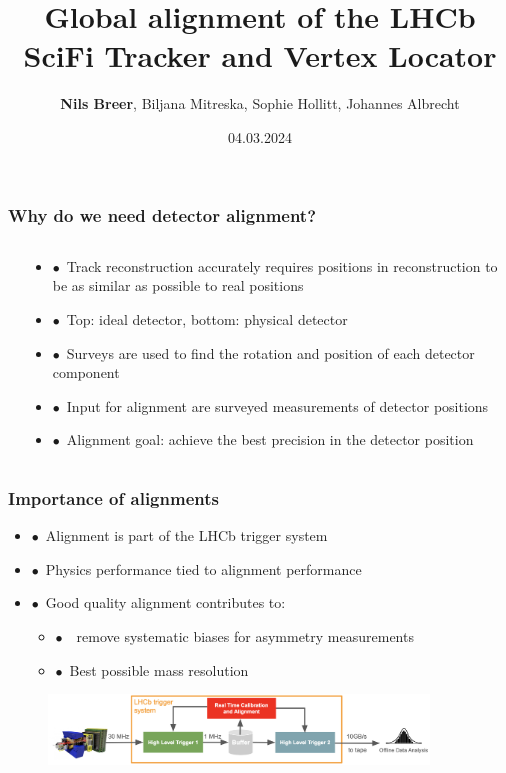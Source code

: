 \documentclass[aspectratio=1610, 12pt, xcolor=dvipsnames]{beamer}
\title{Global alignment of the LHCb SciFi Tracker and Vertex Locator}
\author[N.Breer]{\textbf{Nils Breer}, Biljana Mitreska, Sophie Hollitt, Johannes Albrecht}
\institute{DPG Conference, Karlsruhe}
\date{04.03.2024}
\begin{document}
\maketitle

\begin{frame}\frametitle{Why do we need detector alignment?}
  \begin{columns}
    \begin{column}[c]{0.5\textwidth}
      
    \end{column}
    \begin{column}[c]{0.5\textwidth}
      \begin{itemize}
        \item $\bullet$\, Track reconstruction accurately requires positions in reconstruction to be as similar as possible to real positions
        \item $\bullet$\, Top: ideal detector, bottom: physical detector
        \item $\bullet$\, Surveys are used to find the rotation and position of each detector component
        \item $\bullet$\, Input for alignment are surveyed measurements of detector positions
        \item $\bullet$\, Alignment goal: achieve the best precision in the detector position
      \end{itemize}
    \end{column}
  \end{columns}
\end{frame}

\begin{frame}\frametitle{Importance of alignments}
  \begin{itemize}
    \item $\bullet$\, Alignment is part of the LHCb trigger system
    \item $\bullet$\, Physics performance tied to alignment performance
    \item $\bullet$\, Good quality alignment contributes to:
    \begin{itemize}
      \item $\bullet$\, \to\, remove systematic biases for asymmetry measurements
      \item $\bullet$\, Best possible mass resolution
    \end{itemize}
  \end{itemize}
  \begin{figure}
      \includegraphics[width=0.9\textwidth]{logos/dataflow.png}%
  \end{figure}
\end{frame}
\end{document}
